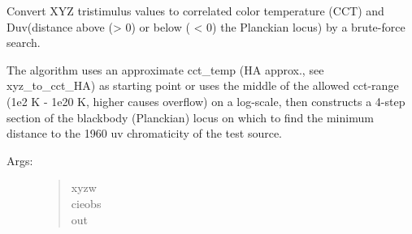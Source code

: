 \documentclass[letterpaper,10pt,english]{sphinxmanual}
\begin{document}

\begin{fulllineitems}
\label{\detokenize{color:luxpy.color.cct.xyz_to_cct_search}}
Convert XYZ tristimulus values to correlated color temperature (CCT) and 
Duv(distance above (\textgreater{} 0) or below ( \textless{} 0) the Planckian locus) by a 
brute-force search.

\begin{DUlineblock}{0em}
\item[] The algorithm uses an approximate cct\_temp (HA approx., see xyz\_to\_cct\_HA) 
as starting point or uses the middle of the allowed cct-range 
(1e2 K - 1e20 K, higher causes overflow) on a log-scale, then constructs 
a 4-step section of the blackbody (Planckian) locus on which to find the
minimum distance to the 1960 uv chromaticity of the test source.
\end{DUlineblock}
\begin{description}
\item[{Args:}] \leavevmode\begin{quote}\begin{description}
\item[{xyzw}] \leavevmode
{}

\item[{cieobs}] \leavevmode
{}

\item[{out}] \leavevmode
{}


\end{description}
\end{quote}
\end{description}
\end{fulllineitems}
\end{document}
